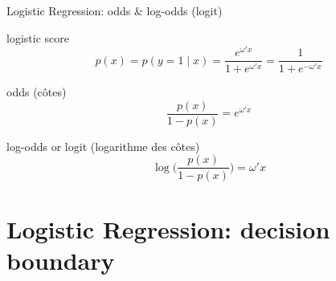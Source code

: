 \documentclass[
  9pt,
  ignorenonframetext,
  aspectratio=169,
  t, dvipsnames]{beamer}
\theoremstyle{definition}
\begin{document}
\begin{frame}{Logistic Regression: odds \& log-odds (logit)}
\protect\hypertarget{logistic-regression-odds-log-odds-logit}{}
\begin{block}{logistic score}
\[p(x) = p(y=1\mid x) = {\displaystyle \frac{e^{\omega' x}}{1+e^{\omega' x}}} = {\displaystyle \frac{1}{1+e^{-\omega' x}}}\]

\end{block}

\begin{alertblock}{odds (côtes)}
\[{\displaystyle \frac{p(x)}{1-p(x)}} = e^{\omega' x}\]

\end{alertblock}

\begin{exampleblock}{log-odds or logit (logarithme des côtes)}
\[\log \big({\displaystyle \frac{p(x)}{1-p(x)}}\big) = \omega' x\]

\end{exampleblock}
\end{frame}

\hypertarget{logistic-regression-decision-boundary}{%
\section{Logistic Regression: decision
boundary}\label{logistic-regression-decision-boundary}}
\end{document}
